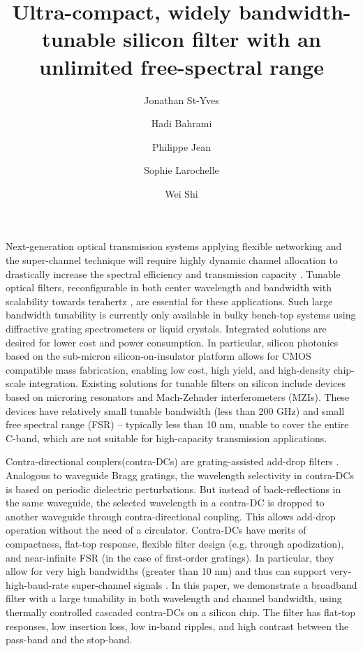 \documentclass[9pt,twocolumn,twoside]{osajnl}
\title{Ultra-compact, widely bandwidth-tunable silicon filter with an unlimited free-spectral range}
\author[1]{Jonathan St-Yves}
\author[1]{Hadi Bahrami}
\author[1]{Philippe Jean}
\author[1]{Sophie Larochelle}
\author[1,*]{Wei Shi}
\affil[1]{Centre d'optique, photonique et laser (COPL) and Département de génie électrique et génie informatique, Université Laval, 2375 rue de la Terrasse, Québec (Québec), Canada, G1V 0A6}
\affil[*]{Corresponding author: wei.shi@gel.ulaval.ca}
\begin{document}
\maketitle
\thispagestyle{fancy}


Next-generation optical transmission systems applying flexible networking and the super-channel technique will require highly dynamic channel allocation to drastically increase the spectral efficiency and transmission capacity \cite{jinno2009spectrum, geisler2011demonstration}.
Tunable optical filters, reconfigurable in both center wavelength and bandwidth with scalability towards terahertz \cite{geisler2011demonstration}, are essential for these applications.
Such large bandwidth tunability is currently only available in bulky bench-top systems using diffractive grating spectrometers or liquid crystals.
Integrated solutions are desired for lower cost and power consumption.
In particular, silicon photonics  based on the sub-micron silicon-on-insulator platform allows for CMOS compatible mass fabrication, enabling low cost, high yield, and high-density chip-scale integration.
Existing solutions for tunable  filters on silicon include devices based on microring resonators \cite{DynamicBW, ong2013ultra} and Mach-Zehnder interferometers (MZIs). These devices have relatively small tunable bandwidth (less than 200 GHz) and small free spectral range (FSR) -- typically less than 10 nm, unable to cover the entire C-band, which are not suitable for high-capacity transmission applications.

Contra-directional couplers(contra-DCs) are grating-assisted add-drop filters \cite{shi2013siliconContraDC}. 
Analogous to waveguide Bragg gratings, the wavelength selectivity in contra-DCs is based on periodic dielectric perturbations. But instead of back-reflections in the same waveguide, the selected wavelength in a contra-DC is dropped to another waveguide through contra-directional coupling.
This allows add-drop operation without the need of a circulator. 
Contra-DCs have merits of compactness, flat-top response, flexible filter design (e.g, through apodization), and near-infinite FSR (in the case of first-order gratings).
In particular, they allow for very high bandwidths (greater than 10 nm) and thus can support very-high-baud-rate super-channel signals \cite{jinno2009spectrum}.
In this paper, we demonstrate a broadband filter with a large tunability in both wavelength and channel bandwidth, using thermally controlled cascaded contra-DCs on a silicon chip. 
The filter has flat-top responses, low insertion loss, low in-band ripples, and high contrast between the pass-band and the stop-band.
\end{document}
